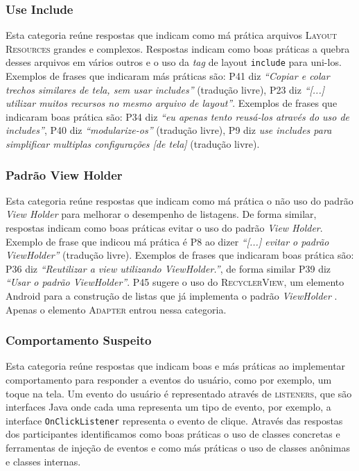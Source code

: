 \subsubsection{Use Include}
Esta categoria re\'une respostas que indicam como m\'a pr\'atica arquivos \textsc{Layout Resources} grandes e complexos. Respostas indicam como boas pr\'aticas a quebra desses arquivos em v\'arios outros e o uso da \textit{tag} de layout \texttt{include} para uni-los. Exemplos de frases que indicaram m\'as pr\'aticas s\~ao: P41 diz \textit{``Copiar e colar trechos similares de tela, sem usar includes''} (tradu\c{c}\~ao livre), P23 diz \textit{``[...] utilizar muitos recursos no mesmo arquivo de layout''}. Exemplos de frases que indicaram boas pr\'atica s\~ao: P34 diz \textit{``eu apenas tento reus\'a-los atrav\'es do uso de includes''}, P40 diz \textit{``modularize-os''} (tradu\c{c}\~ao livre), P9 diz \textit{use includes para simplificar multiplas configura\c{c}\~oes [de tela]} (tradu\c{c}\~ao livre). 

\subsubsection{Padr\~ao View Holder}
Esta categoria re\'une respostas que indicam como m\'a pr\'atica o n\~ao uso do padr\~ao \textit{View Holder} \cite{AluraViewHolder} para melhorar o desempenho de listagens. De forma similar, respostas indicam como boas pr\'aticas evitar o uso do padr\~ao \textit{View Holder}. Exemplo de frase que indicou m\'a pr\'atica \'e P8 ao dizer \textit{``[...] evitar o padr\~ao ViewHolder''} (tradu\c{c}\~ao livre). Exemplos de frases que indicaram boas pr\'atica s\~ao: P36 diz \textit{``Reutilizar a view utilizando ViewHolder.''}, de forma similar P39 diz \textit{``Usar o padr\~ao ViewHolder''}. P45 sugere o uso do \textsc{RecyclerView}, um elemento Android para a constru\c{c}\~ao de listas que j\'a implementa o padr\~ao \textit{ViewHolder} \cite{AluraViewHolder}. Apenas o elemento \textsc{Adapter} entrou nessa categoria. 

\subsubsection{Comportamento Suspeito}
Esta categoria re\'une respostas que indicam boas e m\'as pr\'aticas ao implementar comportamento para responder a eventos do usu\'ario, como por exemplo, um toque na tela. Um evento do usu\'ario \'e representado atrav\'es de \textsc{listeners}, que s\~ao interfaces Java onde cada uma representa um tipo de evento, por exemplo, a interface \texttt{OnClickListener} representa o evento de clique. Atrav\'es das respostas dos participantes identificamos como boas pr\'aticas o uso de classes concretas e ferramentas de inje\c{c}\~ao de eventos e como m\'as pr\'aticas o uso de classes an\^onimas e classes internas.

